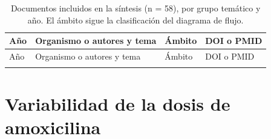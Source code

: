 \documentclass[10pt,a4paper]{article}
\begin{document}
{\small
\begin{longtable}{@{}l L{7.9cm} l L{4.4cm}@{}}
\caption{Documentos incluidos en la síntesis (n = 58), por grupo temático y año. El ámbito sigue la clasificación del diagrama de flujo.}\\
\toprule
Año & Organismo o autores y tema & Ámbito & DOI o PMID \\
\midrule
\endfirsthead
\toprule
Año & Organismo o autores y tema & Ámbito & DOI o PMID \\
\midrule
\endhead
\bottomrule
\endfoot
{}
\end{longtable}
}

\section{Variabilidad de la dosis de amoxicilina}
\end{document}
